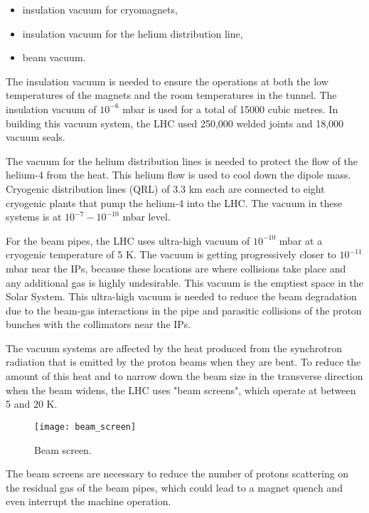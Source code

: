 \begin{normalsize}
\begin{itemize}
\item insulation vacuum for cryomagnets,
\item insulation vacuum for the helium distribution line,
\item beam vacuum.
\end{itemize}


The insulation vacuum is needed to ensure the operations at both the low temperatures of the magnets and the room temperatures in the tunnel. The insulation vacuum of $10^{-6}$ mbar is used for a total of 15000 cubic metres. In building this vacuum system, the LHC used 250,000 welded joints and 18,000 vacuum seals. 


The vacuum for the helium distribution lines is needed to protect the flow of the helium-4 from the heat. This helium flow is used to cool down the dipole mass. Cryogenic distribution lines (QRL) of 3.3 km each are connected to eight cryogenic plants that pump the helium-4 into the LHC. The vacuum in these systems is at $10^{-7}-10^{-10}$ mbar level. 



For the beam pipes, the LHC uses ultra-high vacuum of $10^{-10}$ mbar at a cryogenic temperature of 5 K. The vacuum is getting progressively closer to $10^{-11}$ mbar near the IPs, because these locations are where collisions take place and any additional gas is highly undesirable. This vacuum is the emptiest space in the Solar System. This ultra-high vacuum is needed to reduce the beam degradation due to the beam-gas interactions in the pipe and parasitic collisions of the proton bunches with the collimators near the IPs. 

The vacuum systems are affected by the heat produced from the synchrotron radiation that is emitted by the proton beams when they are bent. To reduce the amount of this heat and to narrow down the beam size in the transverse direction when the beam widens, the LHC uses "beam screens", which operate at between 5 and 20 K. 


\begin{figure}[H]
  \centering
  \texttt{[image: beam\_screen]}
  \caption{Beam screen.}\label{beam_screen}
\end{figure}



The beam screens are necessary to reduce the number of protons scattering on the residual gas of the beam pipes, which could lead to a magnet quench and even interrupt the machine operation. 


\end{normalsize}
